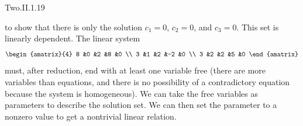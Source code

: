 \begin{ans}{Two.II.1.19}
\begin{exparts}
\begin{equation*}
           \end{equation*}
           to show that there is only the solution $c_1=0$,
           $c_2=0$, and $c_3=0$.
        \partsitem This set is linearly dependent.
           The linear system
           \begin{equation*}
             \begin{amatrix}{4}
               8  &0  &2  &8  &0  \\
               3  &1  &2  &-2 &0  \\
               3  &2  &2  &5  &0
             \end{amatrix}
           \end{equation*}
           must, after reduction, end with at least one variable free
           (there are more variables than equations, and there is no
           possibility of a contradictory equation because the system is
           homogeneous).
           We can take the free variables as parameters to describe the
           solution set.
           We can then set the parameter to a nonzero value to get a
           nontrivial linear relation.
      \end{exparts}
     
\end{ans}
